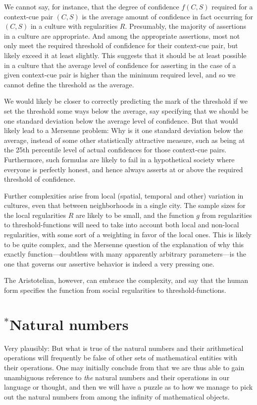 We cannot say, for instance, that the degree of confidence $f(C,S)$ required for a context-cue pair $(C,S)$ 
is the average amount of confidence in fact occurring for $(C,S)$ in a culture with regularities $R$. Presumably,
the majority of assertions in a culture are appropriate. And among the appropriate assertions, most not only meet
the required threshold of confidence for their context-cue pair, but likely exceed it at least slightly. This 
suggests that it should be at least possible in a culture that the average level of confidence for asserting in 
the case of a given context-cue pair is higher than the minimum required level, and so we cannot define the 
threshold as the average. 

We would likely be closer to correctly predicting the mark of the threshold if we set the threshold some ways below
the average, say specifying that we should be one standard deviation below the 
average level of confidence. But that would likely lead to a Mersenne problem: Why is it one standard deviation below 
the average, instead of some other statistically attractive measure, such as being at the 25th percentile level of 
actual confidences for those context-cue pairs. Furthermore, such formulas are likely to fail in a hypothetical 
society where everyone is perfectly honest, and hence always asserts at or above the required threshold of confidence.

Further complexities arise from local (spatial, temporal and other) variation in cultures, even that between neighborhoods 
in a single city. The 
sample sizes for the local regularities $R$ are likely to be small, and the function $g$ from regularities to 
threshold-functions will need to take into account both local and non-local regularities, with some sort of a weighting 
in favor of the local ones. This is likely to be quite complex, and the Mersenne question of the explanation of 
why this exactly function---doubtless with many apparently arbitrary parameters---is the one that governs our 
assertive behavior is indeed a very pressing one. 

The Aristotelian, however, can embrace the complexity, and say that the human form specifies the function from social 
regularities to threshold-functions. 

\section{$^*$Natural numbers}
Very plausibly:
But what is true of the natural numbers and their arithmetical operations will frequently be false of other sets of mathematical
entities with their operations. One may initially conclude from  that we are thus able to gain unambiguous
reference to \textit{the} natural numbers and their operations in our language or thought, and then we will have a puzzle as 
to how we manage to pick out the natural numbers from among the infinity of mathematical objects.

